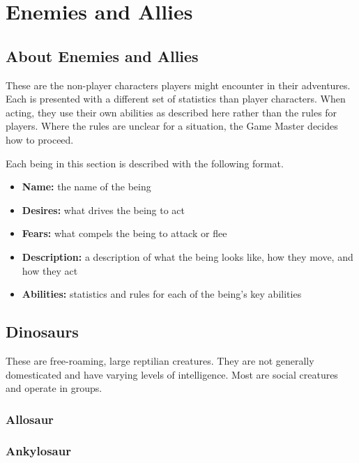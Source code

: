 \chapter{Enemies and Allies}

\begin{multicols}{2}

\section{About Enemies and Allies}

These are the non-player characters players might encounter in 
their adventures. Each is presented with a different set of 
statistics than player characters. When acting, they use their 
own abilities as described here rather than the rules for players. 
Where the rules are unclear for a situation, the Game Master decides 
how to proceed.

Each being in this section is described with the following format.

\begin{itemize}
    \item \textbf{Name:} the name of the being
    \item \textbf{Desires:} what drives the being to act
    \item \textbf{Fears:} what compels the being to attack or flee
    \item \textbf{Description:} a description of what the being looks like, how they move, and how they act
    \item \textbf{Abilities:} statistics and rules for each of the being's key abilities
\end{itemize}

\section{Dinosaurs}

These are free-roaming, large reptilian creatures. They
are not generally domesticated and have varying levels
of intelligence. Most are social creatures and operate in
groups.

\subsection{Allosaur}

\subsection{Ankylosaur}


\end{multicols}
